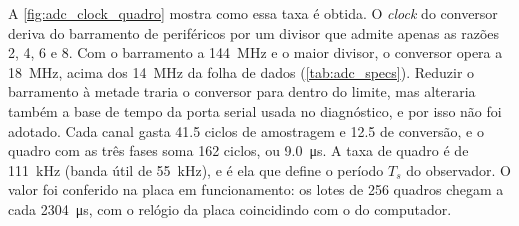 A \autoref{fig:adc_clock_quadro} mostra como essa taxa é obtida. O
\textit{clock} do conversor deriva do barramento de periféricos por um divisor
que admite apenas as razões \num{2}, \num{4}, \num{6} e \num{8}. Com o
barramento a \SI{144}{\mega\hertz} e o maior divisor, o conversor opera a
\SI{18}{\mega\hertz}, acima dos \SI{14}{\mega\hertz} da folha de dados
(\autoref{tab:adc_specs}). Reduzir o barramento à metade traria o conversor para
dentro do limite, mas alteraria também a base de tempo da porta serial usada no
diagnóstico, e por isso não foi adotado. Cada canal gasta \num{41,5} ciclos de
amostragem e \num{12,5} de conversão, e o quadro com as três fases soma
\num{162} ciclos, ou \SI{9,0}{\micro\second}. A taxa de quadro é de
\SI{111}{\kilo\hertz} (banda útil de \SI{55}{\kilo\hertz}), e é ela que define
o período $T_s$ do observador. O valor foi conferido na placa em funcionamento:
os lotes de \num{256} quadros chegam a cada \SI{2304}{\micro\second}, com o
relógio da placa coincidindo com o do computador.

